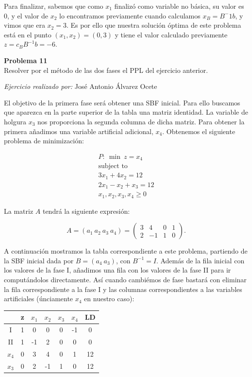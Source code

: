 \documentclass[11pt,table]{article}
\newenvironment{problem}[2][Problema]
    { \begin{mdframed}[backgroundcolor=gray!20] \textbf{#1 #2} \\}
    {  \end{mdframed}}
\begin{document}
\begin{enumerate}
        Para finalizar, sabemos que como \(x_1\) finalizó como variable no básica, su valor es \(0\), y el valor de \(x_2\) lo encontramos previamente cuando calculamos \(x_B = B^-1 b\), y vimos que era \(x_2 = 3\). Es por ello que nuestra solución óptima de este problema está en el punto \((x_1,x_2) = (0,3)\) y tiene el valor calculado previamente \(z = c_B B^{-1} b = -6 \).\\
    \end{enumerate}


\begin{problem}{11}
	Resolver por el método de las dos fases el PPL del ejercicio anterior.
\end{problem}

\emph{Ejercicio realizado por:} José Antonio Álvarez Ocete

El objetivo de la primera fase será obtener una SBF inicial. Para ello buscamos que aparezca en la parte superior de la tabla una matriz identidad. La variable de holgura \(x_3\) nos proporciona la segunda columna de dicha matriz. Para obtener la primera añadimos una variable artificial adicional, \(x_4\). Obtenemos el siguiente problema de minimización:


\begin{align*}
	P: \ \min \ z = x_4\\
	\text{subject to} \\
	3x_{1} + 4x_{2} = 12 \\
	2x_{1} - x_{2} + x_3 = 12\\
	x_{1}, x_{2}, x_3, x_4 \geq 0
\end{align*}


La matriz $A$ tendrá la siguiente expresión:

\[
A = (a_1 \ a_2 \ a_3 \ a_4) =
\begin{pmatrix}
	3 & 4 & 0 & 1\\
	2 & -1 & 1 & 0
\end{pmatrix}.
\]

A continuación mostramos la tabla correspondiente a este problema, partiendo de la SBF inicial dada por $B=(a_4 \ a_3)$, con $B^{-1}=I$. Además de la fila inicial con los valores de la fase I, añadimos una fila con los valores de la fase II para ir computándolos directamente. Así cuando cambiémos de fase bastará con eliminar la fila correspondiente a la fase I y las columnas correspondientes a las variables artificiales (únciamente \(x_4\) en nuestro caso):

\begin{table}[H]
	\centering
	\begin{tabular}{c|ccccc|c}
		& z & $x_1$ & $x_2$ & $x_3$ & $x_4$ & LD \\
		\hline
		I & 1 & 0 & 0 & 0 & -1 & 0\\
		II & 1 & -1 & 2 & 0 & 0 & 0\\
		\hline
		$x_4$ & 0 & 3 & 4 & 0 & 1 & 12\\
		$x_3$ & 0 & 2 & -1 & 1 & 0 & 12
	\end{tabular}
\end{table}
\end{document}
